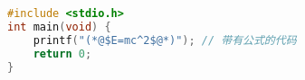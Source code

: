 \begin{appendix}
\begin{lstlisting}[language=C]
#include <stdio.h>
int main(void) {
    printf("(*@$E=mc^2$@*)"); // 带有公式的代码
    return 0;
}
\end{lstlisting}
\end{appendix}